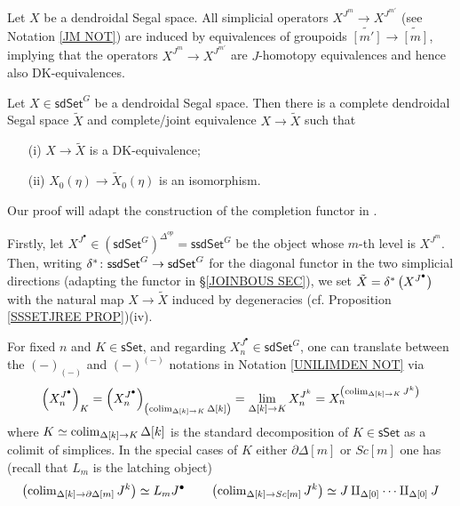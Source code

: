 \documentclass[a4paper,10pt
 ,draft
]{article}%
\begin{document}
\begin{remark}\label{ALLXJK REM}
	Let $X$ be a dendroidal Segal space. All simplicial operators
	$X^{J^m} \to X^{J^{m'}}$
	(see Notation \ref{JM NOT})
	are induced by equivalences of groupoids $\widetilde{[m']} \to \widetilde{[m]}$, 
	implying that the operators 
	$X^{J^m} \to X^{J^{m'}}$
	are $J$-homotopy equivalences and hence also DK-equivalences.
\end{remark}








\begin{proposition}\label{COMPLE PROP}
Let $X \in \mathsf{sdSet}^G$ be a dendroidal Segal space. 
Then there is a complete dendroidal Segal space $\tilde{X}$
and complete/joint equivalence $X \to \tilde{X}$ such that
\begin{itemize}
	\item[(i)] $X \to \tilde{X}$ is 
	a DK-equivalence;
	\item[(ii)] $X_0(\eta) \to \tilde{X}_0(\eta)$ is an isomorphism.
\end{itemize}
\end{proposition}

Our proof will adapt the construction of the completion functor in \cite[\S 14]{Rez01}.

Firstly, let 
$X^{J^{\bullet}} \in (\mathsf{sdSet}^G)^{\Delta^{op}}
= \mathsf{ssdSet}^G$
be the object whose $m$-th level
is $X^{J^m}$. 
Then, writing
$\delta^{\**} \colon \mathsf{ssdSet}^G \to \mathsf{sdSet}^G$
for the diagonal functor in the two simplicial directions
(adapting the functor in \S \ref{JOINBOUS SEC}), we set
$\tilde{X} = \delta^{\**}\left(X^{J^{\bullet}}\right)$ with the natural map $X \to \tilde{X}$ induced by degeneracies (cf. Proposition \ref{SSSETJREE PROP})(iv).


\begin{remark}\label{NOTTRANS REM}
For fixed $n$ and $K\in \mathsf{sSet}$, and regarding 
$X_n^{J^{\bullet}} \in \mathsf{sdSet}^G$,
one can translate between the 
$(-)_{(-)}$ and $(-)^{(-)}$ notations in Notation \ref{UNILIMDEN NOT} via
\[
	\left(X^{J^{\bullet}}_n\right)_K
=
	\left(X^{J^{\bullet}}_n\right)_{
	\left(\operatorname{colim}_{\Delta[k] \to K} \Delta[k]\right)}
=
	\lim_{
	\Delta[k] \to K
	} X^{J^k}_n
=
	X^{\left(\operatorname{colim}_{\Delta[k] \to K} J^k\right)}_n
\]
where $K \simeq \operatorname{colim}_{\Delta[k] \to K} \Delta[k]$ is the standard
decomposition of $K\in \mathsf{sSet}$ as a colimit of simplices.
In the special cases of $K$ either $\partial \Delta[m]$ or $Sc[m]$
one has (recall that $L_m$ is the latching object)
\[	\left(\operatorname{colim}_{\Delta[k] \to \partial \Delta[m]} J^k\right) \simeq L_m J^{\bullet}
\qquad
	\left(\operatorname{colim}_{\Delta[k] \to Sc[m]} J^k\right) \simeq 
	J \amalg_{\Delta[0]} \cdots \amalg_{\Delta[0]} J
\]
\end{remark}
\end{document}
